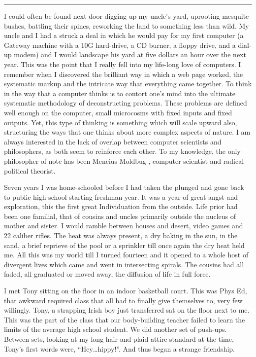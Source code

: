 \documentclass[ebook, 10pt, openright, onecolumn]{memoir}
\newcommand*\td[1]{
  \todo[inline]{
     #1 
  }
}
\newcommand*\starbreak{\fancybreak*{* * *\\}}
\newcommand*\finish{\td{ ----- Finish this section -----}}
\begin{document}
\finish

\starbreak

I could often be found next door digging up my uncle's yard, uprooting
mesquite bushes, battling their spines, reworking the land to something less
than wild.  My uncle and I had a struck a deal in which he would pay for my
first computer (a Gateway machine with a 10G hard-drive, a CD burner, a floppy
drive, and a dial-up modem) and I would landscape his yard at five dollars an
hour over the next year.  This was the point that I really fell into my
life-long love of computers.  I remember when I discovered the brilliant way in
which a web page worked, the systematic markup and the intricate way that
everything came together.  To think in the way that a computer thinks is to
contort one's mind into the ultimate systematic methodology of deconstructing
problems.  These problems are defined well enough on the computer, small
microcosms with fixed inputs and fixed outputs.  Yet, this type of thinking is
something which will scale upward also, structuring the ways that one thinks
about more complex aspects of nature.  I am always interested in the lack of
overlap between computer scientists and philosophers, as both seem to reinforce
each other. To my knowledge, the only philosopher of note has been Mencius
Moldbug , computer scientist and radical political
theorist.

\finish

Seven years I was home-schooled before I had taken the plunged and gone back to
public high-school starting freshman year.  It was a year of great angst and
exploration, this the first great Individuation from the outside.  Life prior
had been one familial, that of cousins and uncles primarily outside the nucleus
of mother and sister.  I would ramble between houses and desert, video games and
22 caliber rifles.  The heat was always present, a dry baking in the sun, in the
sand, a brief reprieve of the pool or a sprinkler till once again the dry heat
held me.  All this was my world till I turned fourteen and it opened to a whole
host of divergent lives which came and went in intersecting spirals.  The
cousins had all faded, all graduated or moved away, the diffusion of life in
full force.

I met Tony sitting on the floor in an indoor basketball court.  This was Phys
Ed, that awkward required class that all had to finally give themselves to, very
few willingly.  Tony, a strapping Irish boy just transferred sat on the floor
next to me. This was the part of the class that our body-building teacher failed
to learn the limits of the average high school student.  We did another set of
push-ups. Between sets, looking at my long hair and plaid attire standard at the
time, Tony's first words were, ``Hey\ldots hippy!''.  And thus began a strange
friendship.
\end{document}
